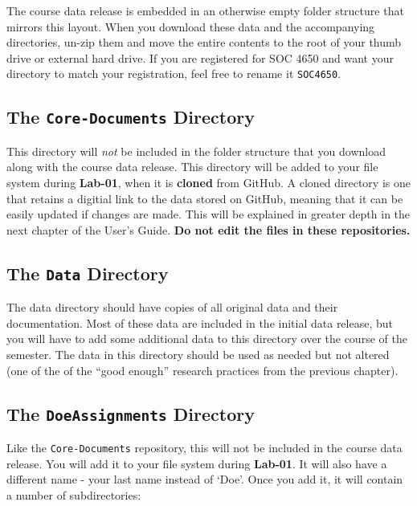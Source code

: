 \documentclass[]{book}
\begin{document}
The course data release is embedded in an otherwise empty folder
structure that mirrors this layout. When you download these data and the
accompanying directories, un-zip them and move the entire contents to
the root of your thumb drive or external hard drive. If you are
registered for SOC 4650 and want your directory to match your
registration, feel free to rename it \texttt{SOC4650}.

\subsection{\texorpdfstring{The \texttt{Core-Documents}
Directory}{The Core-Documents Directory}}\label{the-core-documents-directory}

This directory will \emph{not} be included in the folder structure that
you download along with the course data release. This directory will be
added to your file system during \textbf{Lab-01}, when it is
\textbf{cloned} from GitHub. A cloned directory is one that retains a
digitial link to the data stored on GitHub, meaning that it can be
easily updated if changes are made. This will be explained in greater
depth in the next chapter of the User's Guide. \textbf{Do not edit the
files in these repositories.}

\subsection{\texorpdfstring{The \texttt{Data}
Directory}{The Data Directory}}\label{the-data-directory}

The data directory should have copies of all original data and their
documentation. Most of these data are included in the initial data
release, but you will have to add some additional data to this directory
over the course of the semester. The data in this directory should be
used as needed but not altered (one of the of the ``good enough''
research practices from the previous chapter).

\subsection{\texorpdfstring{The \texttt{DoeAssignments}
Directory}{The DoeAssignments Directory}}\label{the-doeassignments-directory}

Like the \texttt{Core-Documents} repository, this will not be included
in the course data release. You will add it to your file system during
\textbf{Lab-01}. It will also have a different name - your last name
instead of `Doe'. Once you add it, it will contain a number of
subdirectories:
\end{document}
